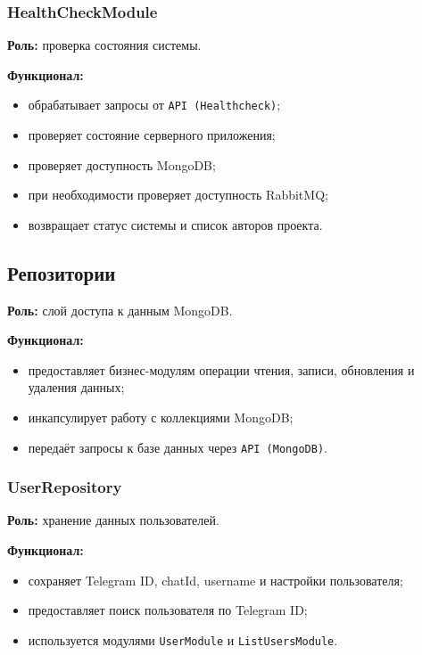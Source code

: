 \documentclass[10pt,a4paper,final]{article} %
\begin{document}
\subsubsection{HealthCheckModule}

\textbf{Роль:} проверка состояния системы.

\textbf{Функционал:}
\begin{itemize}
    \item обрабатывает запросы от \texttt{API (Healthcheck)};
    \item проверяет состояние серверного приложения;
    \item проверяет доступность MongoDB;
    \item при необходимости проверяет доступность RabbitMQ;
    \item возвращает статус системы и список авторов проекта.
\end{itemize}

\subsection{Репозитории}

\textbf{Роль:} слой доступа к данным MongoDB.

\textbf{Функционал:}
\begin{itemize}
    \item предоставляет бизнес-модулям операции чтения, записи, обновления и
    удаления данных;
    \item инкапсулирует работу с коллекциями MongoDB;
    \item передаёт запросы к базе данных через \texttt{API (MongoDB)}.
\end{itemize}

\subsubsection{UserRepository}

\textbf{Роль:} хранение данных пользователей.

\textbf{Функционал:}
\begin{itemize}
    \item сохраняет Telegram ID, chatId, username и настройки пользователя;
    \item предоставляет поиск пользователя по Telegram ID;
    \item используется модулями \texttt{UserModule} и \texttt{ListUsersModule}.
\end{itemize}
\end{document}
